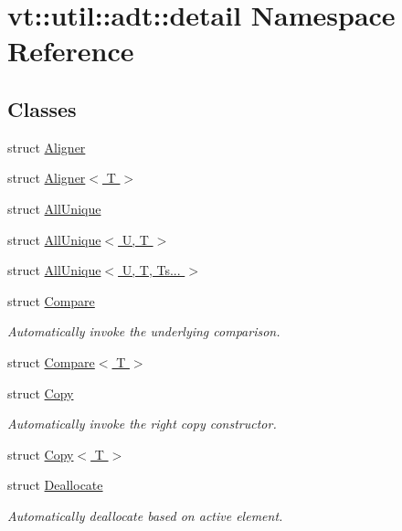 \hypertarget{namespacevt_1_1util_1_1adt_1_1detail}{}\section{vt\+:\+:util\+:\+:adt\+:\+:detail Namespace Reference}
\label{namespacevt_1_1util_1_1adt_1_1detail}
\subsection*{Classes}
\begin{DoxyCompactItemize}
\item 
struct \hyperlink{structvt_1_1util_1_1adt_1_1detail_1_1_aligner}{Aligner}
\item 
struct \hyperlink{structvt_1_1util_1_1adt_1_1detail_1_1_aligner_3_01_t_01_4}{Aligner$<$ T $>$}
\item 
struct \hyperlink{structvt_1_1util_1_1adt_1_1detail_1_1_all_unique}{All\+Unique}
\item 
struct \hyperlink{structvt_1_1util_1_1adt_1_1detail_1_1_all_unique_3_01_u_00_01_t_01_4}{All\+Unique$<$ U, T $>$}
\item 
struct \hyperlink{structvt_1_1util_1_1adt_1_1detail_1_1_all_unique_3_01_u_00_01_t_00_01_ts_8_8_8_01_4}{All\+Unique$<$ U, T, Ts... $>$}
\item 
struct \hyperlink{structvt_1_1util_1_1adt_1_1detail_1_1_compare}{Compare}
\begin{DoxyCompactList}\small\item\em Automatically invoke the underlying comparison. \end{DoxyCompactList}\item 
struct \hyperlink{structvt_1_1util_1_1adt_1_1detail_1_1_compare_3_01_t_01_4}{Compare$<$ T $>$}
\item 
struct \hyperlink{structvt_1_1util_1_1adt_1_1detail_1_1_copy}{Copy}
\begin{DoxyCompactList}\small\item\em Automatically invoke the right copy constructor. \end{DoxyCompactList}\item 
struct \hyperlink{structvt_1_1util_1_1adt_1_1detail_1_1_copy_3_01_t_01_4}{Copy$<$ T $>$}
\item 
struct \hyperlink{structvt_1_1util_1_1adt_1_1detail_1_1_deallocate}{Deallocate}
\begin{DoxyCompactList}\small\item\em Automatically deallocate based on active element. \end{DoxyCompactList}\item 

\end{DoxyCompactItemize}
